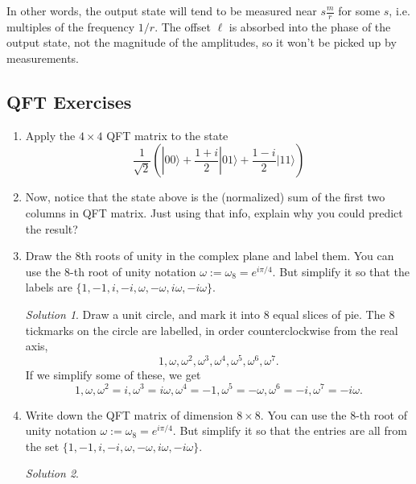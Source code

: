 \documentclass{article}
\theoremstyle{plain}
\theoremstyle{definition}
\theoremstyle{remark}
\newtheorem*{solution}{Solution}
\numberwithin{theorem}{section}
\begin{document}
In other words, the output state will tend to be measured near $s\frac{m}{r}$ for some $s$, i.e. multiples of the frequency $1/r$.
The offset $\ell$ is absorbed into the phase of the output state, not the magnitude of the amplitudes, so it won't be picked up by measurements.


\subsection{QFT Exercises}



\begin{enumerate}

\item Apply the $4 \times 4$ QFT matrix to the state
\[
  \frac{1}{\sqrt{2}} \left(
|00 \rangle +
\frac{1+i}{2} |01 \rangle +
\frac{1-i}{2} |11 \rangle
  \right)
\]
\item Now, notice that the state above is the (normalized) sum of the first two columns in QFT matrix.  Just using that info, explain why you could predict the result?

\item Draw the 8th roots of unity in the complex plane and label them.  You can use the $8$-th root of unity notation $\omega := \omega_8 = e^{i \pi/4}$.  But simplify it so that the labels are $\{1,-1,i,-i, \omega, -\omega, i\omega, -i\omega\}$.

\begin{solution}
Draw a unit circle, and mark it into 8 equal slices of pie.  The 8 tickmarks on the circle are labelled, in order counterclockwise from the real axis, 
\[
1, \omega, \omega^2, \omega^3, \omega^4, \omega^5, \omega^6, \omega^7.
\]
If we simplify some of these, we get
\[
1, \omega, \omega^2 = i, \omega^3 = i \omega, \omega^4 = -1, \omega^5 = -\omega, \omega^6 = -i, \omega^7 = -i \omega.
\]
\end{solution}
	
			\item Write down the QFT matrix of dimension $8 \times 8$.  You can use the $8$-th root of unity notation $\omega := \omega_8 = e^{i \pi/4}$.  But simplify it so that the entries are all from the set $\{1,-1,i,-i, \omega, -\omega, i\omega, -i\omega\}$.

				\begin{solution}


\end{solution}
\end{enumerate}
\end{document}
